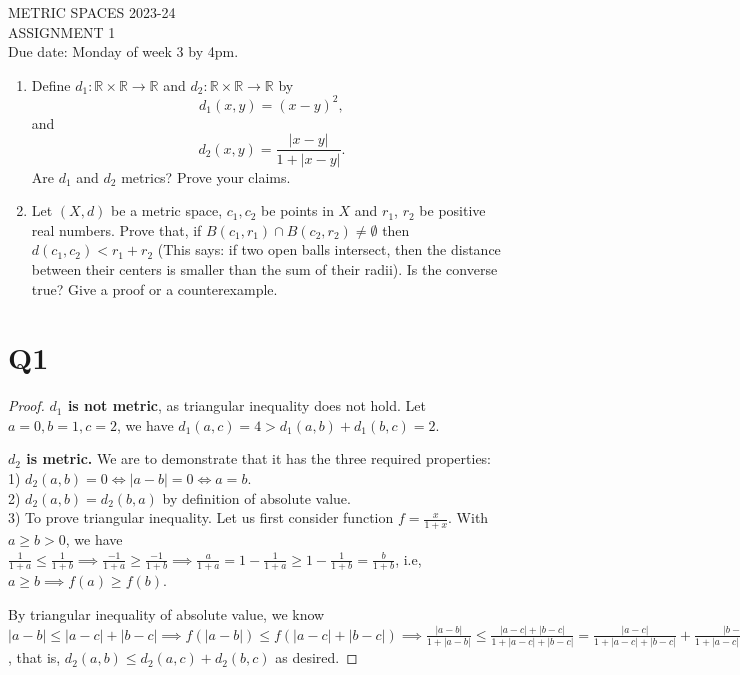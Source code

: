 \documentclass[12pt]{article}
\begin{document}
\begin{center}
	METRIC SPACES 2023-24\\
	ASSIGNMENT 1\\
	Due date: Monday of week 3 by 4pm.
\end{center}

\bigskip 

\begin{enumerate}
	\item Define $d_1: \mathbb{R}\times \mathbb{R} \to \mathbb{R}$ and $d_2: \mathbb{R}\times \mathbb{R} \to \mathbb{R}$  by 
	\[
	d_1(x,y)=(x-y)^2,
	\]
	and
	\[
	d_2(x,y)=\frac{|x-y|}{1+|x-y|}.
	\]
	Are $d_1$ and $d_2$ metrics? Prove your claims. 
	
	
	\item Let $(X,d)$ be a metric space, $c_1, c_2$ be points in $X$ and $r_1$, $r_2$ be positive real numbers. Prove that, if $B(c_1,r_1) \cap B(c_2,r_2) \not=\emptyset$ then $d(c_1, c_2) < r_1 + r_2$ (This says: if two open balls intersect, then the distance between their centers is smaller than the sum of their radii). Is the converse true? Give a proof or a counterexample.
\end{enumerate}

\section{Q1}
\begin{proof}

	\textbf{$d_1$ is not metric}, as triangular inequality does not hold.
	Let $a = 0, b = 1, c=2$, we have $d_1(a, c) = 4 > d_1(a, b) + d_1(b, c) = 2$.

	\textbf{$d_2$ is metric.} We are to demonstrate that it has the three required properties:\\
	1) $d_2(a,b) = 0 \iff |a-b| = 0 \iff a = b$. \\
	2) $d_2(a,b) = d_2(b, a)$ by definition of absolute value. \\
	3) To prove triangular inequality. Let us first consider function $f = \frac{x}{1+x}$. With $a\geq b>0$, we have $\frac{1}{1+a} \leq  \frac{1}{1+b} \implies \frac{-1}{1+a} \geq  \frac{-1}{1+b} \implies \frac{a}{1+a} = 1-\frac{1}{1+a} \geq  1 - \frac{1}{1+b} = \frac{b}{1+b}$, i.e, $a\geq b \implies f(a) \geq  f(b)$.

	By triangular inequality of absolute value, we know $|a-b| \leq  |a-c| + |b-c| \implies f(|a-b|) \leq  f(|a-c| + |b-c|) \implies \frac{|a-b|}{1+|a-b|} \leq  \frac{|a-c| + |b-c|}{1+|a-c| + |b-c|} = \frac{|a-c|}{1+|a-c|+|b-c|} + \frac{|b-c|}{1+|a-c|+|b-c|}  \leq \frac{|a-c|}{1+|a-c|} + \frac{|b-c|}{1+|b-c|}$, that is, $d_2(a,b) \leq d_2(a,c) + d_2(b,c)$ as desired.

\end{proof}
\end{document}

